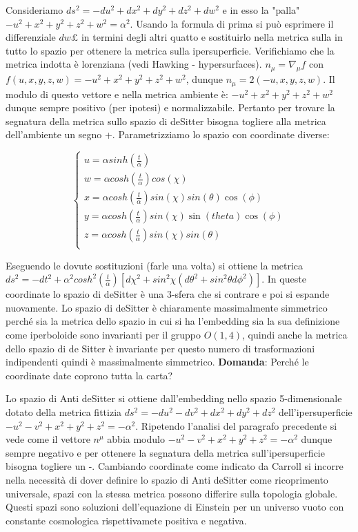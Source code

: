 \documentclass[10pt,a4paper]{article}
\begin{document}
Consideriamo $ds^2 = -du^2 + dx^2+ dy^2+dz^2+dw^2$ e in esso la "palla" $-u^2+x^2+y^2+z^2+w^2 = \alpha^2$. Usando la formula di prima si può esprimere il differenziale $dw£$ in termini degli altri quatto e sostituirlo nella metrica sulla in tutto lo spazio per ottenere la metrica sulla ipersuperficie. Verifichiamo che la metrica indotta è lorenziana (vedi Hawking - hypersurfaces). $n_{\mu} = \nabla_{\mu} f$ con $f(u, x, y, z, w) = -u^2+x^2+y^2+z^2+w^2$, dunque $n_{\mu} = 2(-u, x, y, z, w)$. Il modulo di questo vettore e nella metrica ambiente è: $-u^2+x^2+y^2+z^2+w^2$ dunque sempre positivo (per ipotesi) e normalizzabile. Pertanto per trovare la segnatura della metrica sullo spazio di deSitter bisogna togliere alla metrica dell'ambiente un segno +. Parametrizziamo lo spazio con coordinate diverse:

\begin{equation}
   \begin{cases}
   u = \alpha sinh \left( \frac{t}{\alpha} \right) \\
   w = \alpha cosh \left( \frac{t}{\alpha} \right) cos (\chi)\\
   x = \alpha cosh \left( \frac{t}{\alpha} \right) sin (\chi) sin(\theta) \cos(\phi)\\
   y = \alpha cosh \left( \frac{t}{\alpha} \right) sin(\chi) \sin(theta) \cos(\phi)\\
   z = \alpha cosh \left( \frac{t}{\alpha} \right) sin(\chi) sin(\theta) \\
   \end{cases}
\end{equation}

Eseguendo le dovute sostituzioni (farle una volta) si ottiene la metrica $ds^2 = -dt^2 + \alpha^2 cosh^2 \left( \frac{t}{\alpha} \right) [d \chi^2 + sin^2 \chi (d \theta ^ 2 + sin^2 \theta d \phi ^ 2)]$. In queste coordinate lo spazio di deSitter è una 3-sfera che si contrare e poi si espande nuovamente.
Lo spazio di deSitter è chiaramente massimalmente simmetrico perché sia la metrica dello spazio in cui si ha l'embedding sia la sua definizione come iperboloide sono invarianti per il gruppo $O(1,4)$, quindi anche la metrica dello spazio di de Sitter è invariante per questo numero di trasformazioni indipendenti quindi è massimalmente simmetrico.
\textbf{Domanda}: Perché le coordinate date coprono tutta la carta?

Lo spazio di Anti deSitter si ottiene dall'embedding nello spazio 5-dimensionale dotato della metrica fittizia $ds^2 = -du^2 -dv^2 + dx^2 + dy^2 + dz^2$ dell'ipersuperficie $-u^2-v^2+x^2+y^2+z^2 = -\alpha^2$. Ripetendo l'analisi del paragrafo precedente si vede come il vettore $n^{\mu}$ abbia modulo $-u^2-v^2+x^2+y^2+z^2 = -\alpha^2$ dunque sempre negativo e per ottenere la segnatura della metrica sull'ipersuperficie bisogna togliere un -. Cambiando coordinate come indicato da Carroll si incorre nella necessità di dover definire lo spazio di Anti deSitter come ricoprimento universale, spazi con la stessa metrica possono differire sulla topologia globale. Questi spazi sono soluzioni dell'equazione di Einstein per un universo vuoto con constante cosmologica rispettivamete positiva e negativa.
\end{document}

